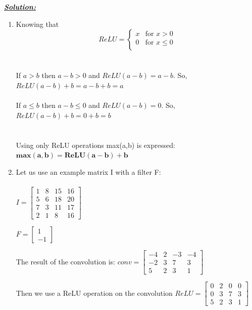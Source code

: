 \documentclass{article}
\begin{document}
\noindent \underline{\textbf{\textit{Solution:}}} \\ 
\begin{enumerate} [label=\Alph*]
    
        \item  Knowing that
            \[ ReLU = \begin{cases}
                x & \text{for } x > 0 \\
                0 & \text{for } x \leq 0 \\
            \end{cases} \] \\ \\If $a > b$ then $a - b > 0$ and $ReLU(a-b) = a - b$. So, $ReLU(a-b) + b = a - b + b = a$ \\ \\
          If $a \leq b$ then $a - b \leq 0$ and $ReLU(a-b) = 0$. So, $ReLU(a-b) + b = 0 + b = b$ \\ \\ \\
          Using only ReLU operations max(a,b) is expressed: $\bm{max(a,b) = ReLU(a-b) +b}$

          \item Let us use an example matrix I with a filter F: \\ \\
          $ I = \begin{bmatrix}
              1 & 8 & 15 & 16 \\
              5 & 6 & 18 & 20 \\
              7 & 3 & 11 & 17 \\
              2 & 1 & 8 & 16
          \end{bmatrix}$

          $ F = \begin{bmatrix}
              1 \\ -1
          \end{bmatrix}$

          The result of the convolution is:
          $ conv = \begin{bmatrix}
              -4 & 2 & -3 & -4 \\
              -2 & 3 & 7 & 3 \\
              5 & 2 & 3 & 1
          \end{bmatrix}$

          Then we use a ReLU operation on the convolution
          $ ReLU = \begin{bmatrix}
              0 & 2 & 0 & 0 \\
              0 & 3 & 7 & 3 \\
              5 & 2 & 3 & 1
          \end{bmatrix}$


\end{enumerate}
\end{document}
